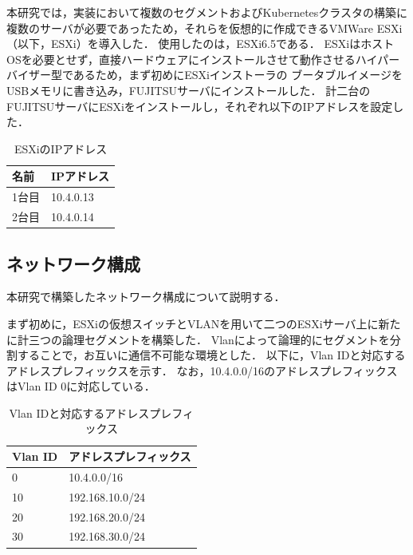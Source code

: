 本研究では，実装において複数のセグメントおよびKubernetesクラスタの構築に複数のサーバが必要であったため，それらを仮想的に作成できるVMWare ESXi（以下，ESXi）を導入した．
使用したのは，ESXi6.5である．
ESXiはホストOSを必要とせず，直接ハードウェアにインストールさせて動作させるハイパーバイザー型であるため，まず初めにESXiインストーラの
ブータブルイメージをUSBメモリに書き込み，FUJITSUサーバにインストールした．
計二台のFUJITSUサーバにESXiをインストールし，それぞれ以下のIPアドレスを設定した．

\begin{table}[htb]
  \begin{center}
    \caption{ESXiのIPアドレス}
    \begin{tabular}{|l|l|} \hline
      名前 & IPアドレス \\ \hline
      1台目 & 10.4.0.13 \\ \hline
      2台目 & 10.4.0.14 \\ \hline
    \end{tabular}
  \end{center}
\end{table}

\subsection{ネットワーク構成}
\label{implementation:network-environment}

本研究で構築したネットワーク構成について説明する．

まず初めに，ESXiの仮想スイッチとVLANを用いて二つのESXiサーバ上に新たに計三つの論理セグメントを構築した．
Vlanによって論理的にセグメントを分割することで，お互いに通信不可能な環境とした．
以下に，Vlan IDと対応するアドレスプレフィックスを示す．
なお，10.4.0.0/16のアドレスプレフィックスはVlan ID 0に対応している．

\begin{table}[htb]
  \begin{center}
    \caption{Vlan IDと対応するアドレスプレフィックス}
    \begin{tabular}{|l|l|} \hline
      Vlan ID & アドレスプレフィックス \\ \hline
      0 & 10.4.0.0/16 \\ \hline
      10 & 192.168.10.0/24 \\ \hline
      20 & 192.168.20.0/24 \\ \hline
      30 & 192.168.30.0/24 \\ \hline
    \end{tabular}
  \end{center}
\end{table}

